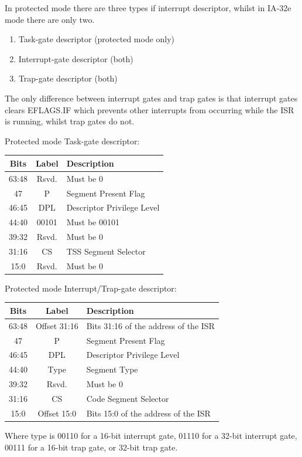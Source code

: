 \documentclass{article}
\newcommand{\layout}[1]{\parbox{\linewidth}{#1}}
\begin{document}
\layout{
  In protected mode there are three types if interrupt descriptor, whilst in IA-32e mode there are only two.

  \begin{enumerate}
    \item Task-gate descriptor (protected mode only)
    \item Interrupt-gate descriptor (both)
    \item Trap-gate descriptor (both)
  \end{enumerate}

  The only difference between interrupt gates and trap gates is that interrupt gates clears EFLAGS.IF which prevents other interrupts from occurring while the ISR is running, whilst trap gates do not.

  \bigskip \cite[Chapter~7.12.1.3]{sdm3}
} \bigskip

\layout{
  Protected mode Task-gate descriptor:
  \begin{table}[H]
    \centering
    \begin{tabular}{|c|c|l|}
      \hline \textbf{Bits} & \textbf{Label} & \textbf{Description} \\ \hline
      63:48 & Rsvd. & Must be 0 \\
      47 & P & Segment Present Flag \\
      46:45 & DPL & Descriptor Privilege Level \\
      44:40 & 00101 & Must be 00101 \\
      39:32 & Rsvd. & Must be 0 \\
      31:16 & CS & TSS Segment Selector \\
      15:0 & Rsvd. & Must be 0 \\ \hline
    \end{tabular}
  \end{table}
}

\layout{
  Protected mode Interrupt/Trap-gate descriptor:
  \begin{table}[H]
    \centering
    \begin{tabular}{|c|c|l|}
      \hline \textbf{Bits} & \textbf{Label} & \textbf{Description} \\ \hline
      63:48 & Offset 31:16 & Bits 31:16 of the address of the ISR \\
      47 & P & Segment Present Flag \\
      46:45 & DPL & Descriptor Privilege Level \\
      44:40 & Type & Segment Type \\
      39:32 & Rsvd. & Must be 0 \\
      31:16 & CS & Code Segment Selector \\
      15:0 & Offset 15:0 & Bits 15:0 of the address of the ISR \\ \hline
    \end{tabular}
  \end{table}

  Where type is 00110 for a 16-bit interrupt gate, 01110 for a 32-bit interrupt gate, 00111 for a 16-bit trap gate, or 32-bit trap gate.

  \bigskip \cite[Chapter~7.11]{sdm3}
} \bigskip
\end{document}
